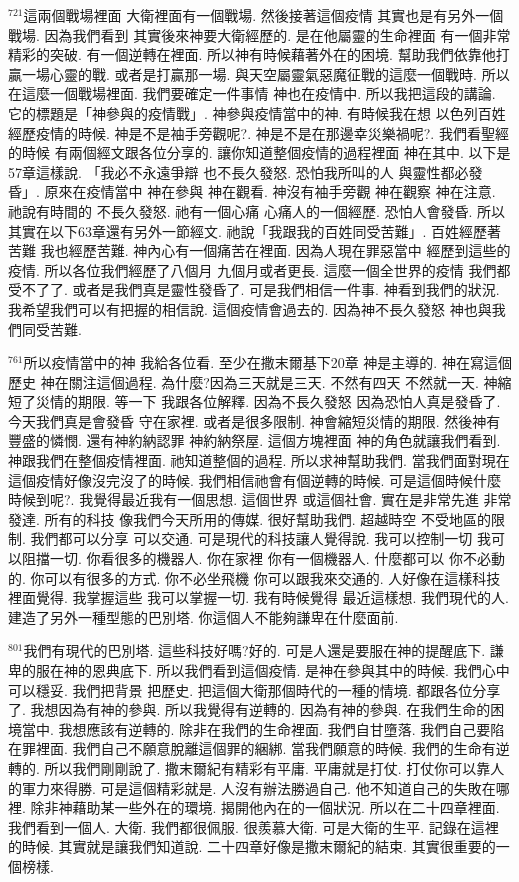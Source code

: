\documentclass{book}
\begin{document}
$^{721}$這兩個戰場裡面 大衛裡面有一個戰場.
然後接著這個疫情 其實也是有另外一個戰場.
因為我們看到 其實後來神要大衛經歷的.
是在他屬靈的生命裡面 有一個非常精彩的突破.
有一個逆轉在裡面.
所以神有時候藉著外在的困境.
幫助我們依靠他打贏一場心靈的戰.
或者是打贏那一場.
與天空屬靈氣惡魔征戰的這麼一個戰時.
所以在這麼一個戰場裡面.
我們要確定一件事情 神也在疫情中.
所以我把這段的講論.
它的標題是「神參與的疫情戰」.
神參與疫情當中的神.
有時候我在想 以色列百姓經歷疫情的時候.
神是不是袖手旁觀呢?.
神是不是在那邊幸災樂禍呢?.
我們看聖經的時候 有兩個經文跟各位分享的.
讓你知道整個疫情的過程裡面 神在其中.
以下是57章這樣說.
「我必不永遠爭辯 也不長久發怒.
恐怕我所叫的人 與靈性都必發昏」.
原來在疫情當中 神在參與 神在觀看.
神沒有袖手旁觀 神在觀察 神在注意.
祂說有時間的 不長久發怒.
祂有一個心痛 心痛人的一個經歷.
恐怕人會發昏.
所以其實在以下63章還有另外一節經文.
祂說「我跟我的百姓同受苦難」.
百姓經歷著苦難 我也經歷苦難.
神內心有一個痛苦在裡面.
因為人現在罪惡當中 經歷到這些的疫情.
所以各位我們經歷了八個月 九個月或者更長.
這麼一個全世界的疫情 我們都受不了了.
或者是我們真是靈性發昏了.
可是我們相信一件事.
神看到我們的狀況.
我希望我們可以有把握的相信說.
這個疫情會過去的.
因為神不長久發怒 神也與我們同受苦難.

$^{761}$所以疫情當中的神 我給各位看.
至少在撒末爾基下20章 神是主導的.
神在寫這個歷史 神在關注這個過程.
為什麼?因為三天就是三天.
不然有四天 不然就一天.
神縮短了災情的期限.
等一下 我跟各位解釋.
因為不長久發怒 因為恐怕人真是發昏了.
今天我們真是會發昏 守在家裡.
或者是很多限制.
神會縮短災情的期限.
然後神有豐盛的憐憫.
還有神約納認罪 神約納祭屋.
這個方塊裡面 神的角色就讓我們看到.
神跟我們在整個疫情裡面.
祂知道整個的過程.
所以求神幫助我們.
當我們面對現在這個疫情好像沒完沒了的時候.
我們相信祂會有個逆轉的時候.
可是這個時候什麼時候到呢?.
我覺得最近我有一個思想.
這個世界 或這個社會.
實在是非常先進 非常發達.
所有的科技 像我們今天所用的傳媒.
很好幫助我們.
超越時空 不受地區的限制.
我們都可以分享 可以交通.
可是現代的科技讓人覺得說.
我可以控制一切 我可以阻擋一切.
你看很多的機器人.
你在家裡 你有一個機器人.
什麼都可以 你不必動的.
你可以有很多的方式.
你不必坐飛機 你可以跟我來交通的.
人好像在這樣科技裡面覺得.
我掌握這些 我可以掌握一切.
我有時候覺得 最近這樣想.
我們現代的人.
建造了另外一種型態的巴別塔.
你這個人不能夠謙卑在什麼面前.

$^{801}$我們有現代的巴別塔.
這些科技好嗎?好的.
可是人還是要服在神的提醒底下.
謙卑的服在神的恩典底下.
所以我們看到這個疫情.
是神在參與其中的時候.
我們心中可以穩妥.
我們把背景 把歷史.
把這個大衛那個時代的一種的情境.
都跟各位分享了.
我想因為有神的參與.
所以我覺得有逆轉的.
因為有神的參與.
在我們生命的困境當中.
我想應該有逆轉的.
除非在我們的生命裡面.
我們自甘墮落.
我們自己要陷在罪裡面.
我們自己不願意脫離這個罪的綑綁.
當我們願意的時候.
我們的生命有逆轉的.
所以我們剛剛說了.
撒末爾紀有精彩有平庸.
平庸就是打仗.
打仗你可以靠人的軍力來得勝.
可是這個精彩就是.
人沒有辦法勝過自己.
他不知道自己的失敗在哪裡.
除非神藉助某一些外在的環境.
揭開他內在的一個狀況.
所以在二十四章裡面.
我們看到一個人.
大衛.
我們都很佩服.
很羨慕大衛.
可是大衛的生平.
記錄在這裡的時候.
其實就是讓我們知道說.
二十四章好像是撒末爾紀的結束.
其實很重要的一個榜樣.
\end{document}
